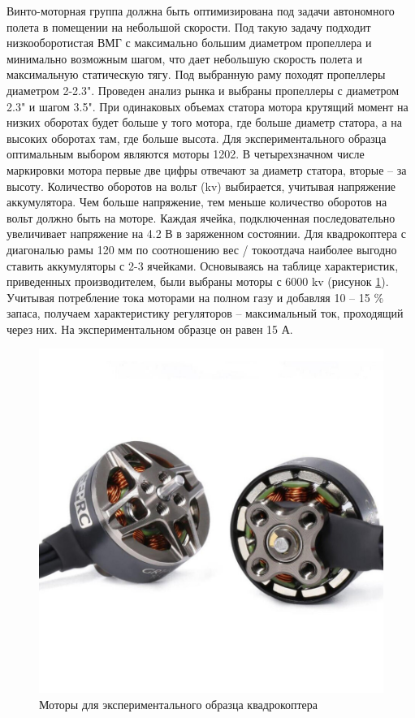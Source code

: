 Винто-моторная группа должна быть оптимизирована под задачи автономного полета в помещении на небольшой скорости. Под такую задачу подходит низкооборотистая ВМГ с максимально большим диаметром пропеллера и минимально возможным шагом, что дает небольшую скорость полета и максимальную статическую тягу. Под выбранную раму походят пропеллеры диаметром 2-2.3". Проведен анализ рынка и выбраны пропеллеры с диаметром 2.3" и шагом 3.5". При одинаковых объемах статора мотора крутящий момент на низких оборотах будет больше у того мотора, где больше диаметр статора, а на высоких оборотах там, где больше высота. Для экспериментального образца оптимальным выбором являются моторы 1202. В четырехзначном числе маркировки мотора первые две цифры отвечают за диаметр статора, вторые -- за высоту. Количество оборотов на вольт (kv) выбирается, учитывая напряжение аккумулятора. Чем больше напряжение, тем меньше количество оборотов на вольт должно быть на моторе. Каждая ячейка, подключенная последовательно увеличивает напряжение на 4.2 В в заряженном состоянии. Для квадрокоптера с диагональю рамы 120 мм по соотношению вес / токоотдача наиболее выгодно ставить аккумуляторы с 2-3 ячейками. Основываясь на таблице характеристик, приведенных производителем, были выбраны моторы с 6000 kv (рисунок \ref{fig:motor}).
Учитывая потребление тока моторами на полном газу и добавляя 10 -- 15 \% запаса, получаем характеристику регуляторов -- максимальный ток, проходящий через них. На экспериментальном образце он равен 15 А.
\begin{figure}[H]
	\centering
	\includegraphics[width=0.5\linewidth]{../RW/pics/motor}
	\caption{Моторы для экспериментального образца квадрокоптера
	}
	\label{fig:motor} %
\end{figure}

